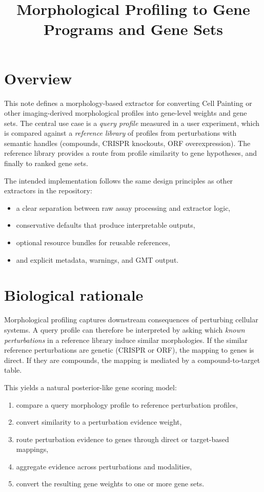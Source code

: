 \documentclass[11pt]{article}
\title{Morphological Profiling to Gene Programs and Gene Sets}
\author{}
\date{}
\begin{document}
\maketitle

\section*{Overview}
This note defines a morphology-based extractor for converting Cell Painting or other imaging-derived morphological profiles into gene-level weights and gene sets. The central use case is a \emph{query profile} measured in a user experiment, which is compared against a \emph{reference library} of profiles from perturbations with semantic handles (compounds, CRISPR knockouts, ORF overexpression). The reference library provides a route from profile similarity to gene hypotheses, and finally to ranked gene sets.

The intended implementation follows the same design principles as other extractors in the repository:
\begin{itemize}[leftmargin=2em]
\item a clear separation between raw assay processing and extractor logic,
\item conservative defaults that produce interpretable outputs,
\item optional resource bundles for reusable references,
\item and explicit metadata, warnings, and GMT output.
\end{itemize}

\section{Biological rationale}
Morphological profiling captures downstream consequences of perturbing cellular systems. A query profile can therefore be interpreted by asking which \emph{known perturbations} in a reference library induce similar morphologies. If the similar reference perturbations are genetic (CRISPR or ORF), the mapping to genes is direct. If they are compounds, the mapping is mediated by a compound-to-target table.

This yields a natural posterior-like gene scoring model:
\begin{enumerate}[leftmargin=2em]
\item compare a query morphology profile to reference perturbation profiles,
\item convert similarity to a perturbation evidence weight,
\item route perturbation evidence to genes through direct or target-based mappings,
\item aggregate evidence across perturbations and modalities,
\item convert the resulting gene weights to one or more gene sets.
\end{enumerate}
\end{document}
